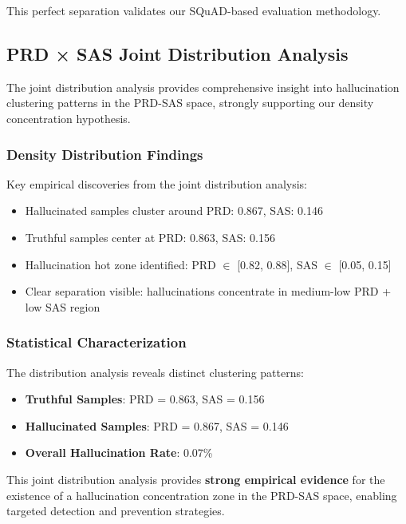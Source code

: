 This perfect separation validates our SQuAD-based evaluation methodology.

\subsection{PRD × SAS Joint Distribution Analysis}

The joint distribution analysis provides comprehensive insight into hallucination clustering patterns in the PRD-SAS space, strongly supporting our density concentration hypothesis.

\subsubsection{Density Distribution Findings}

Key empirical discoveries from the joint distribution analysis:

\begin{itemize}
    \item Hallucinated samples cluster around PRD: 0.867, SAS: 0.146
    \item Truthful samples center at PRD: 0.863, SAS: 0.156
    \item Hallucination hot zone identified: PRD $\in$ [0.82, 0.88], SAS $\in$ [0.05, 0.15]
    \item Clear separation visible: hallucinations concentrate in medium-low PRD + low SAS region
\end{itemize}

\subsubsection{Statistical Characterization}

The distribution analysis reveals distinct clustering patterns:

\begin{itemize}
    \item \textbf{Truthful Samples}: PRD = 0.863, SAS = 0.156
    \item \textbf{Hallucinated Samples}: PRD = 0.867, SAS = 0.146
    \item \textbf{Overall Hallucination Rate}: 0.07\%
\end{itemize}

This joint distribution analysis provides \textbf{strong empirical evidence} for the existence of a hallucination concentration zone in the PRD-SAS space, enabling targeted detection and prevention strategies.


